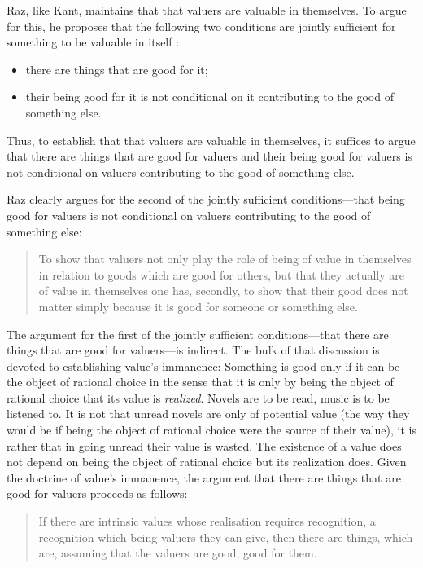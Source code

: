 \documentclass[a4paper,12pt]{article}
\begin{document}
Raz, like Kant, maintains that that valuers are valuable in themselves. To argue for this, he proposes that the following two conditions are jointly sufficient for something to be valuable in itself \citep[151--2]{Raz:2001ps}:
\begin{itemize}
	\item there are things that are good for it;
	\item their being good for it is not conditional on it contributing to the good of something else. 
\end{itemize}
Thus, to establish that that valuers are valuable in themselves, it suffices to argue that there are things that are good for valuers and their being good for valuers is not conditional on valuers contributing to the good of something else. 

Raz clearly argues for the second of the jointly sufficient conditions---that being good for valuers is not conditional on valuers contributing to the good of something else:
\begin{quote}
	To show that valuers not only play the role of being of value in themselves in relation to goods which are good for others, but that they actually are of value in themselves one has, secondly, to show that their good does not matter simply because it is good for someone or something else. \citep[156]{Raz:2001ps}
\end{quote}

The argument for the first of the jointly sufficient conditions---that there are things that are good for valuers---is indirect. The bulk of that discussion is devoted to establishing value's immanence: Something is good only if it can be the object of rational choice in the sense that it is only by being the object of rational choice that its value is \emph{realized}. Novels are to be read, music is to be listened to. It is not that unread novels are only of potential value (the way they would be if being the object of rational choice were the source of their value), it is rather that in going unread their value is wasted. The existence of a value does not depend on being the object of rational choice but its realization does. Given the doctrine of value's immanence, the argument that there are things that are good for valuers proceeds as follows:
\begin{quote}
	If there are intrinsic values whose realisation requires recognition, a recognition which being valuers they can give, then there are things, which are, assuming that the valuers are good, good for them. \citep[156]{Raz:2001ps}
\end{quote}
\end{document}
